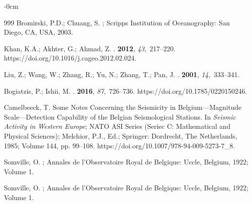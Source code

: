 \documentclass[sensors,article,accept,moreauthors,pdftex]{Definitions/mdpi}
\begin{document}
\begin{adjustwidth}{-\extralength}{0cm}
\begin{thebibliography}{999}
Bromirski, P.D.; Chuang, S.
; Scripps Institution of Oceanography:
  San Diego, CA, USA,  2003.

Khan, K.A.; Akhter, G.; Ahmad, Z.
.
 {\bf 2012}, {\em 43},~217--220.
\newblock
 {https://doi.org/10.1016/j.cageo.2012.02.024}.

Liu, Z.; Wang, W.; Zhang, R.; Yu, N.; Zhang, T.; Pan, J.
.
 {\bf 2001}, {\em 14},~333--341.

Bogiatzis, P.; Ishii, M.
.
 {\bf 2016}, {\em 87},~726--736.
\newblock
 {https://doi.org/10.1785/0220150246}.

Camelbeeck, T.
\newblock Some Notes Concerning the Seismicity in Belgium---Magnitude Scale---Detection Capability of the Belgian Seismological Stations. In {\em
  Seismic Activity in Western Europe}; NATO ASI Series (Seriec C: Mathematical
  and Physical Sciences); Melchior, P.J., Ed.; Springer: Dordrecht,
 The Netherlands,  1985; Volume 144, pp. 99--108.
\newblock
{https://doi.org/10.1007/978-94-009-5273-7\_8}.

Somville, O. %
; Annales de l’Observatoire Royal de Belgique: Uccle, Belgium, 1922; Volume 1.

Somville, O.
;  Annales de l’Observatoire Royal de Belgique: Uccle, Belgium, 1922; Volume 1.


\end{thebibliography}
\end{adjustwidth}
\end{document}
